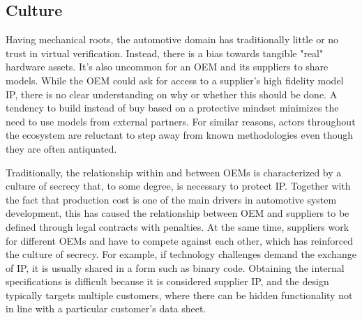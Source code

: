 \subsection{Culture}
Having mechanical roots, the automotive domain has traditionally little or no trust in virtual verification. Instead, there is a bias towards tangible "real" hardware assets.
It's also uncommon for an OEM and its suppliers to share models.
While the OEM could ask for access to a supplier’s high fidelity model IP, there is no clear understanding on why or whether this should be done.
A tendency to build instead of buy based on a protective mindset minimizes the need to use models from external partners. For similar reasons, actors throughout the ecosystem are reluctant to step away from known methodologies even though they are often antiquated.

Traditionally, the relationship within and between OEMs is characterized by a culture of secrecy that, to some degree, is necessary to protect IP. Together with the fact that production cost is one of the main drivers in automotive system development, this has caused the relationship between OEM and suppliers to be defined through legal contracts with penalties. At the same time, suppliers work for different OEMs and have to compete against each other, which has reinforced the culture of secrecy.
For example, if technology challenges demand the exchange of IP, it is usually shared in a form such as binary code.
Obtaining the internal specifications is difficult because it is considered supplier IP, and the design typically targets multiple customers, where there can be hidden functionality not in line with a particular customer’s data sheet.


